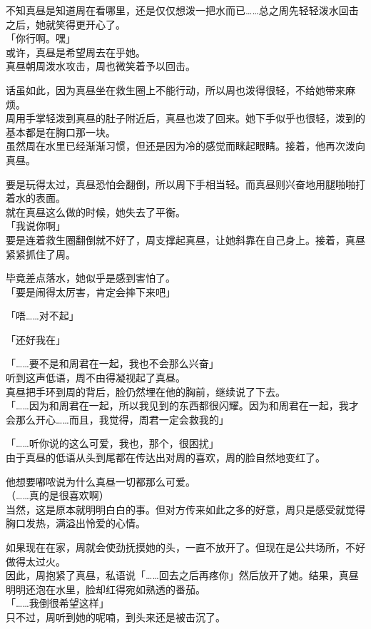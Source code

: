 不知真昼是知道周在看哪里，还是仅仅想泼一把水而已……总之周先轻轻泼水回击之后，她就笑得更开心了。\\

「你行啊。嘿」\\

或许，真昼是希望周去在乎她。\\

真昼朝周泼水攻击，周也微笑着予以回击。

话虽如此，因为真昼坐在救生圈上不能行动，所以周也泼得很轻，不给她带来麻烦。\\

周用手掌轻泼到真昼的肚子附近后，真昼也泼了回来。她下手似乎也很轻，泼到的基本都是在胸口那一块。\\

虽然周在水里已经渐渐习惯，但还是因为冷的感觉而眯起眼睛。接着，他再次泼向真昼。

要是玩得太过，真昼恐怕会翻倒，所以周下手相当轻。而真昼则兴奋地用腿啪啪打着水的表面。\\

就在真昼这么做的时候，她失去了平衡。\\

「我说你啊」\\

要是连着救生圈翻倒就不好了，周支撑起真昼，让她斜靠在自己身上。接着，真昼紧紧抓住了周。

毕竟差点落水，她似乎是感到害怕了。\\

「要是闹得太厉害，肯定会摔下来吧」

「唔……对不起」

「还好我在」

「……要不是和周君在一起，我也不会那么兴奋」\\

听到这声低语，周不由得凝视起了真昼。\\

真昼把手环到周的背后，脸仍然埋在他的胸前，继续说了下去。\\

「……因为和周君在一起，所以我见到的东西都很闪耀。因为和周君在一起，我才会那么开心……而且，我觉得，周君一定会救我的」

「……听你说的这么可爱，我也，那个，很困扰」\\

由于真昼的低语从头到尾都在传达出对周的喜欢，周的脸自然地变红了。

他想要嘟哝说为什么真昼一切都那么可爱。\\

（……真的是很喜欢啊）\\

当然，这是原本就明明白白的事。但对方传来如此之多的好意，周只是感受就觉得胸口发热，满溢出怜爱的心情。

如果现在在家，周就会使劲抚摸她的头，一直不放开了。但现在是公共场所，不好做得太过火。\\

因此，周抱紧了真昼，私语说「……回去之后再疼你」然后放开了她。结果，真昼明明还泡在水里，脸却红得宛如熟透的番茄。\\

「……我倒很希望这样」\\

只不过，周听到她的呢喃，到头来还是被击沉了。
